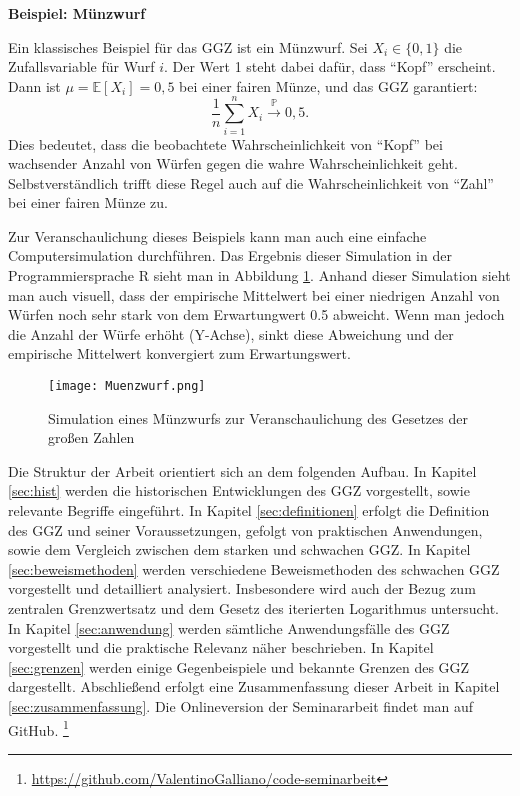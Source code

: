 \documentclass[12pt,a4paper]{article}
\begin{document}
\newpage


\textbf{Beispiel: Münzwurf}

Ein klassisches Beispiel für das GGZ ist ein Münzwurf. Sei \( X_i \in \{0,1\} \) die Zufallsvariable für Wurf \( i \). Der Wert 1 steht dabei dafür, dass \enquote{Kopf} erscheint. Dann ist \( \mu = \mathbb{E}[X_i] = 0{,}5 \) bei einer fairen Münze, und das GGZ garantiert:
\[
\frac{1}{n} \sum_{i=1}^n X_i \xrightarrow{\mathbb{P}} 0{,}5.
\]
Dies bedeutet, dass die beobachtete Wahrscheinlichkeit von \enquote{Kopf} bei wachsender Anzahl von Würfen gegen die wahre Wahrscheinlichkeit geht.
Selbstverständlich trifft diese Regel auch auf die Wahrscheinlichkeit von \enquote{Zahl} bei einer fairen Münze zu. 

Zur Veranschaulichung dieses Beispiels kann man auch eine einfache Computersimulation durchführen.
Das Ergebnis dieser Simulation in der Programmiersprache R sieht man in Abbildung \ref{fig:muenzwurf}.
Anhand dieser Simulation sieht man auch visuell, dass der empirische Mittelwert bei einer niedrigen Anzahl von Würfen noch sehr stark von dem Erwartungwert 0.5 abweicht.
Wenn man jedoch die Anzahl der Würfe erhöht (Y-Achse), sinkt diese Abweichung und der empirische Mittelwert konvergiert zum Erwartungswert.


\begin{figure}[h!]
  \centering
  \texttt{[image: Muenzwurf.png]}
  \caption{Simulation eines Münzwurfs zur Veranschaulichung des Gesetzes der großen Zahlen}
  \label{fig:muenzwurf}
\end{figure}

\newpage

Die Struktur der Arbeit orientiert sich an dem folgenden Aufbau.
In Kapitel \ref{sec:hist} werden die historischen Entwicklungen des GGZ vorgestellt, sowie relevante Begriffe eingeführt.
In Kapitel \ref{sec:definitionen} erfolgt die Definition des GGZ und seiner Voraussetzungen, gefolgt von praktischen Anwendungen, sowie dem Vergleich zwischen dem starken und schwachen GGZ.
In Kapitel \ref{sec:beweismethoden} werden verschiedene Beweismethoden des schwachen GGZ vorgestellt und detailliert analysiert. Insbesondere wird auch der Bezug zum zentralen Grenzwertsatz und dem Gesetz des iterierten Logarithmus untersucht.
In Kapitel \ref{sec:anwendung} werden sämtliche Anwendungsfälle des GGZ vorgestellt und die praktische Relevanz näher beschrieben.
In Kapitel \ref{sec:grenzen} werden einige Gegenbeispiele und bekannte Grenzen des GGZ dargestellt. 
Abschließend erfolgt eine Zusammenfassung dieser Arbeit in Kapitel \ref{sec:zusammenfassung}.
Die Onlineversion der Seminararbeit findet man auf GitHub. \footnote{\url{https://github.com/ValentinoGalliano/code-seminarbeit}}
\end{document}
